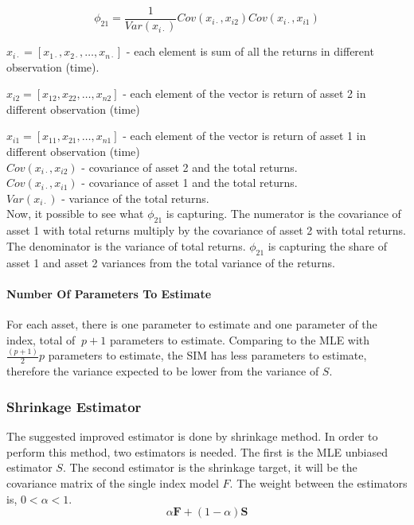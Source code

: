 \documentclass[letterpaper]{article}
\begin{document}
	\[\phi_{21} = \frac{1}{Var(x_{i\cdot})}Cov(x_{i\cdot}, x_{i2})Cov(x_{i\cdot},x_{i1})\]
	
	\(x_{i\cdot} = [x_{1\cdot}, x_{2\cdot}, \dots , x_{n\cdot}]\) - each element is sum of all the returns in different observation (time). 
	
	\(x_{i2} = [x_{12}, x_{22}, \dots , x_{n2}] \) - each element of the vector is return of asset 2 in different observation (time) 
	
	\(x_{i1} = [x_{11}, x_{21}, \dots , x_{n1}] \) - each element of the vector is return of asset 1 in different observation (time)\\
		
	\(Cov(x_{i\cdot}, x_{i2})\) -  covariance of asset 2 and the total returns.\\
	\(Cov(x_{i\cdot}, x_{i1})\) -  covariance of asset 1 and the total returns. \\
	\(Var(x_{i\cdot}) \) - variance of the total returns.\\
	
	Now, it possible to see what \(\phi_{21} \) is capturing. The numerator is the covariance of asset 1 with total returns multiply by the covariance of asset 2 with total returns. The denominator is the variance of total returns. \(\phi_{21}\) is capturing the share of asset 1 and asset 2 variances from the total variance of the returns. 
	
	\paragraph{Number Of Parameters To Estimate}
	For each asset, there is one parameter to estimate and one parameter of the index, total of \(\ p + 1 \) parameters to estimate. Comparing to the MLE with \(\frac{(p+1)}{2}p\) parameters to estimate, the SIM has less parameters to estimate, therefore the variance expected to be lower from the variance of \(S\).
	
	
	\subsubsection{Shrinkage Estimator}
	The suggested improved estimator is done by shrinkage method. In order to perform this method, two estimators is needed. The first is the MLE unbiased estimator \(S\). The second estimator is the shrinkage target, it will be the covariance matrix of the single index model \(F\). The weight between the estimators is,  \(0 < \alpha < 1\). 
	\[
	\alpha
	\boldsymbol{F} +
	\left(
	1- \alpha  
	\right)
	\boldsymbol{S}
	\] 
	
\end{document}
